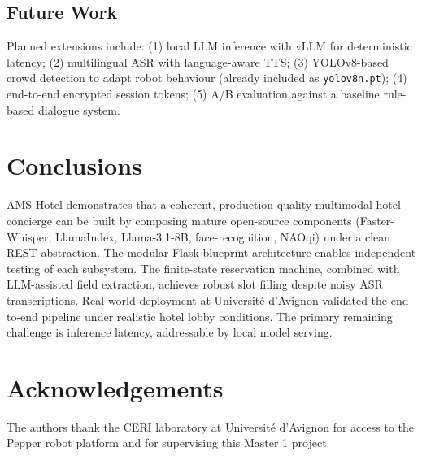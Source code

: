 \documentclass[a4paper]{article}
\begin{document}
\subsection{Future Work}

Planned extensions include: (1) local LLM inference with vLLM for deterministic latency; (2) multilingual ASR with language-aware TTS; (3) YOLOv8-based crowd detection to adapt robot behaviour (already included as \texttt{yolov8n.pt}); (4) end-to-end encrypted session tokens; (5) A/B evaluation against a baseline rule-based dialogue system.

\section{Conclusions}

AMS-Hotel demonstrates that a coherent, production-quality multimodal hotel concierge can be built by composing mature open-source components (Faster-Whisper, LlamaIndex, Llama-3.1-8B, face-recognition, NAOqi) under a clean REST abstraction. The modular Flask blueprint architecture enables independent testing of each subsystem. The finite-state reservation machine, combined with LLM-assisted field extraction, achieves robust slot filling despite noisy ASR transcriptions. Real-world deployment at Universit\'e d'Avignon validated the end-to-end pipeline under realistic hotel lobby conditions. The primary remaining challenge is inference latency, addressable by local model serving.

\section{Acknowledgements}

The authors thank the CERI laboratory at Universit\'e d'Avignon for access to the Pepper robot platform and for supervising this Master 1 project.


\end{document}
